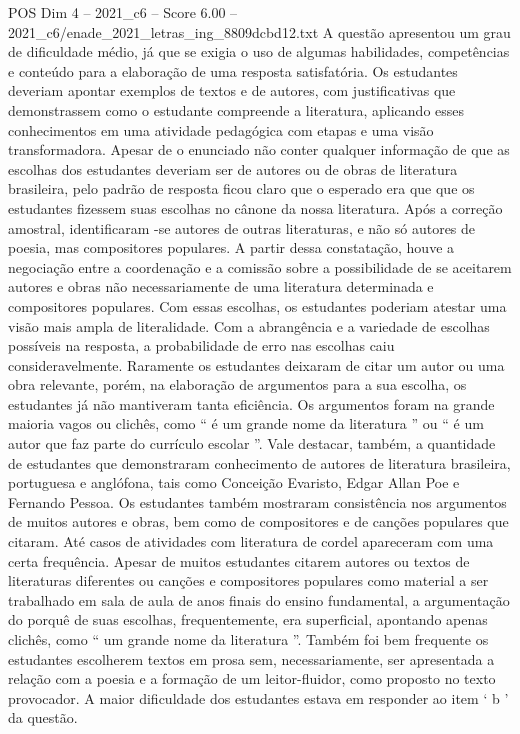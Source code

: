 \begin{textsample}{POS Dim 4 – 2021\_c6 – Score 6.00 – 2021\_c6/enade\_2021\_letras\_ing\_8809dcbd12.txt}
A questão apresentou um grau de dificuldade médio, já que se exigia o uso de algumas habilidades, competências e conteúdo para a elaboração de uma resposta satisfatória.
Os estudantes deveriam apontar exemplos de textos e de autores, com justificativas que demonstrassem como o estudante compreende a literatura, aplicando esses conhecimentos em uma atividade pedagógica com etapas e uma visão transformadora.
Apesar de o enunciado não conter qualquer informação de que as escolhas dos estudantes deveriam ser de autores ou de obras de literatura brasileira, pelo padrão de resposta ficou claro que o esperado era que que os estudantes fizessem suas escolhas no cânone da nossa literatura.
Após a correção amostral, identificaram -se autores de outras literaturas, e não só autores de poesia, mas compositores populares.
A partir dessa constatação, houve a negociação entre a coordenação e a comissão sobre a possibilidade de se aceitarem autores e obras não necessariamente de uma literatura determinada e compositores populares.
Com essas escolhas, os estudantes poderiam atestar uma visão mais ampla de literalidade.
Com a abrangência e a variedade de escolhas possíveis na resposta, a probabilidade de erro nas escolhas caiu consideravelmente.
Raramente os estudantes deixaram de citar um autor ou uma obra relevante, porém, na elaboração de argumentos para a sua escolha, os estudantes já não mantiveram tanta eficiência.
Os argumentos foram na grande maioria vagos ou clichês, como “ é um grande nome da literatura ” ou “ é um autor que faz parte do currículo escolar ”.
Vale destacar, também, a quantidade de estudantes que demonstraram conhecimento de autores de literatura brasileira, portuguesa e anglófona, tais como Conceição Evaristo, Edgar Allan Poe e Fernando Pessoa.
Os estudantes também mostraram consistência nos argumentos de muitos autores e obras, bem como de compositores e de canções populares que citaram.
Até casos de atividades com literatura de cordel apareceram com uma certa frequência.
Apesar de muitos estudantes citarem autores ou textos de literaturas diferentes ou canções e compositores populares como material a ser trabalhado em sala de aula de anos finais do ensino fundamental, a argumentação do porquê de suas escolhas, frequentemente, era superficial, apontando apenas clichês, como “ um grande nome da literatura ”.
Também foi bem frequente os estudantes escolherem textos em prosa sem, necessariamente, ser apresentada a relação com a poesia e a formação de um leitor-fluidor, como proposto no texto provocador.
A maior dificuldade dos estudantes estava em responder ao item ‘ b ’ da questão.

\end{textsample}
